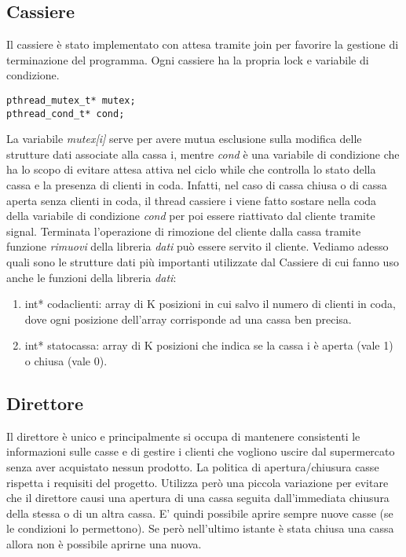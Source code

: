 \documentclass{article} %
\begin{document}
\subsection{Cassiere}
Il cassiere è stato implementato con attesa tramite join per favorire la gestione di terminazione del programma. Ogni cassiere ha la propria lock e variabile di condizione. 
\begin{lstlisting}
pthread_mutex_t* mutex;
pthread_cond_t* cond;
\end{lstlisting}
La variabile {\itshape mutex[i]} serve per avere mutua esclusione sulla modifica delle strutture dati associate alla cassa i, mentre {\itshape cond} è una variabile di condizione che ha lo scopo di evitare attesa attiva nel ciclo while che controlla lo stato della cassa e la presenza di clienti in coda. Infatti, nel caso di cassa chiusa o di cassa aperta senza clienti in coda, il thread cassiere i viene fatto sostare nella coda della variabile di condizione  {\itshape cond} per poi essere riattivato dal cliente tramite signal. Terminata l’operazione di rimozione del cliente dalla cassa tramite funzione {\itshape rimuovi} della libreria {\itshape dati} può essere servito il cliente. Vediamo adesso quali sono le strutture dati più importanti utilizzate dal Cassiere di cui fanno uso anche le funzioni della libreria {\itshape dati}:
\begin{enumerate} 
 \item int* codaclienti: array di K posizioni in cui salvo il numero di clienti in coda, dove ogni posizione dell'array corrisponde ad una cassa ben precisa.
 \item int* statocassa: array di K posizioni che indica se la cassa i è aperta (vale 1) o chiusa (vale 0).
 \end{enumerate}
\subsection{Direttore}
Il direttore è unico e principalmente si occupa di mantenere consistenti le informazioni sulle casse e di gestire i clienti che vogliono uscire dal supermercato senza aver acquistato nessun prodotto. La politica di apertura/chiusura casse rispetta i requisiti del progetto. Utilizza però una piccola variazione per evitare che il direttore causi una apertura di una cassa seguita dall'immediata chiusura della stessa o di un altra cassa. E' quindi possibile aprire sempre nuove casse (se le condizioni lo permettono). Se però nell'ultimo istante è stata chiusa una cassa allora non è possibile aprirne una nuova.
\end{document}
